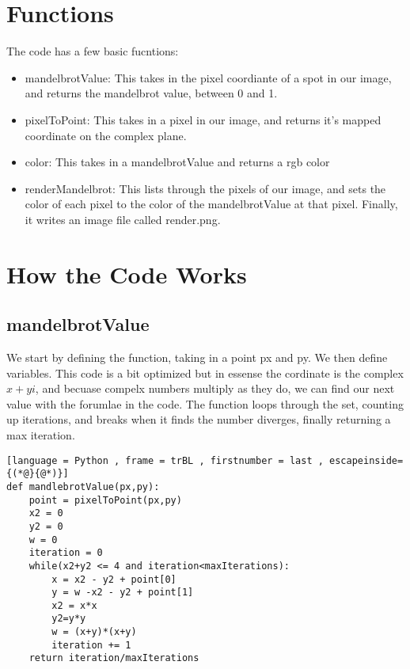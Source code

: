 \documentclass{article}
\begin{document}
\section{Functions}
The code has a few basic fucntions: 
\begin{itemize}
    \item mandelbrotValue:
        This takes in the pixel coordiante of a spot in our image, and returns the mandelbrot value, between 0 and 1.
    \item pixelToPoint:
        This takes in a pixel in our image, and returns it's mapped coordinate on the complex plane. 
    \item color:
        This takes in a mandelbrotValue and returns a rgb color
    \item renderMandelbrot:
        This lists through the pixels of our image, and sets the color of each pixel to the color of the mandelbrotValue at that pixel. Finally, it writes an image file called render.png. 
\end{itemize}
\section{How the Code Works}
\begin{minipage}[t]{0.45\textwidth}
    \subsection{mandelbrotValue}
    We start by defining the function, taking in a point px and py.
    We then define variables. This code is a bit optimized but in essense the cordinate is the complex $x+yi$, and becuase compelx numbers multiply as they do, we can find our next value with the forumlae in the code. The function loops through the set, counting up iterations, and breaks when it finds the number diverges, finally returning a max iteration.
\end{minipage}
\hspace{20pt}
\begin{minipage}[t]{0.5\textwidth}
    \begin{lstlisting}[language = Python , frame = trBL , firstnumber = last , escapeinside={(*@}{@*)}]
def mandlebrotValue(px,py):
    point = pixelToPoint(px,py)
    x2 = 0
    y2 = 0
    w = 0
    iteration = 0
    while(x2+y2 <= 4 and iteration<maxIterations):
        x = x2 - y2 + point[0]
        y = w -x2 - y2 + point[1]
        x2 = x*x
        y2=y*y
        w = (x+y)*(x+y)
        iteration += 1
    return iteration/maxIterations
    \end{lstlisting}
\end{minipage}
\end{document}
